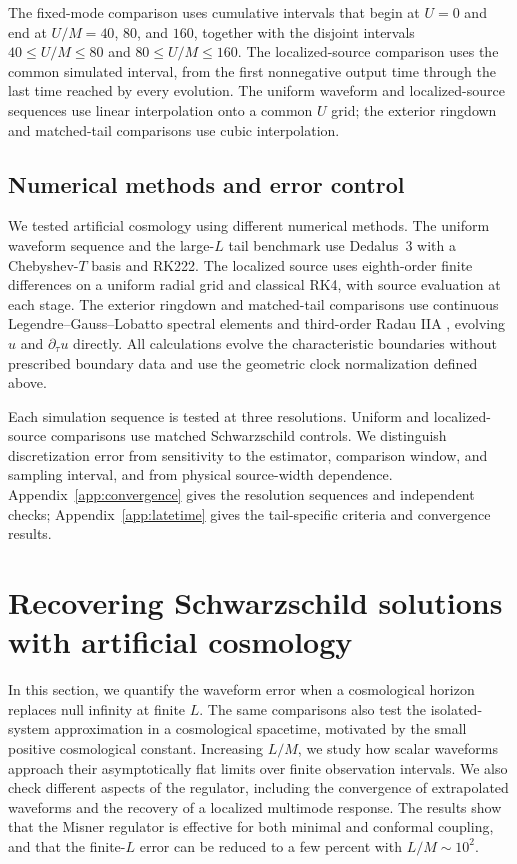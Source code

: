 \documentclass[
 aps,
 prd,
 reprint,
 superscriptaddress,
 nofootinbib,
 longbibliography
]{revtex4-2}
\begin{document}
The fixed-mode comparison uses cumulative intervals that begin at $U=0$ and
end at $U/M=40$, $80$, and $160$, together with the disjoint intervals
$40\leq U/M\leq80$ and $80\leq U/M\leq160$.  The localized-source comparison
uses the common simulated interval, from the first nonnegative output time
through the last time reached by every evolution.
The uniform waveform and localized-source sequences use linear interpolation
onto a common $U$ grid; the exterior ringdown and matched-tail comparisons
use cubic interpolation.

\subsection{Numerical methods and error control}
\label{sec:numerical-methods}

We tested artificial cosmology using different numerical methods. The uniform waveform sequence and the large-$L$ tail benchmark
use Dedalus~3 \cite{burns_dedalus_2020} with a Chebyshev-$T$ basis and RK222.
The localized source uses eighth-order finite differences on a uniform
radial grid and classical RK4, with source evaluation at each stage.
The exterior ringdown and matched-tail comparisons use continuous
Legendre--Gauss--Lobatto spectral elements \cite{Gassner:2013SBP} and
third-order Radau IIA \cite{HairerWanner:1999Radau}, evolving $u$ and
$\partial_\tau u$ directly. All calculations evolve the characteristic boundaries without prescribed boundary data and use the geometric clock
normalization defined above.

Each simulation sequence is tested at three resolutions.  Uniform and
localized-source comparisons use matched Schwarzschild controls.  We distinguish
discretization error from sensitivity to the estimator, comparison window,
and sampling interval, and
from physical source-width dependence.  Appendix~\ref{app:convergence} gives
the resolution sequences and independent checks;
Appendix~\ref{app:latetime} gives the tail-specific criteria and convergence
results.

\section{Recovering Schwarzschild solutions with artificial cosmology}
\label{sec:results}

In this section, we quantify the waveform error when a cosmological horizon
replaces null infinity at finite $L$.
The same comparisons also test the isolated-system approximation in a
cosmological spacetime, motivated by the small positive cosmological constant.  Increasing $L/M$, we study how scalar waveforms approach their asymptotically flat limits over finite observation intervals. We also check different aspects of the regulator, including the convergence of extrapolated waveforms and the recovery of a localized multimode response.  The results show that the Misner regulator is effective for both minimal and conformal coupling, and that the finite-$L$ error can be reduced to a few percent with $L/M\sim 10^2$.
\end{document}
